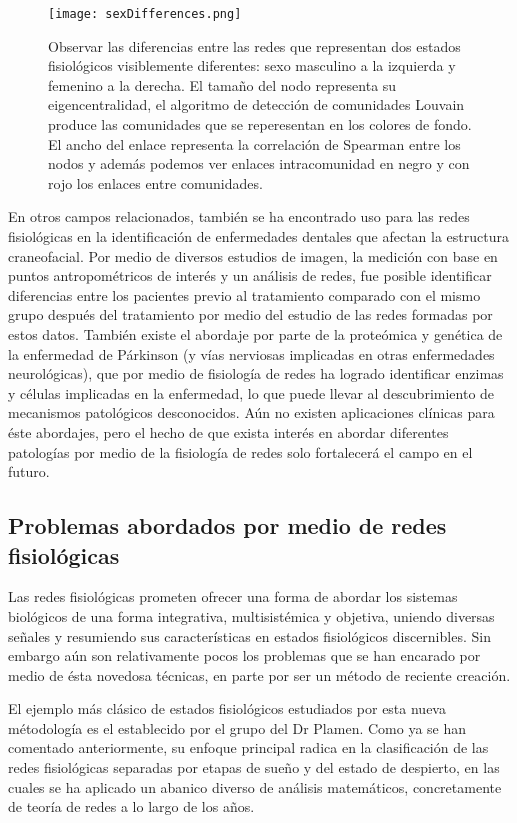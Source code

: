 \documentclass[twoside,twocolumn]{article}
\begin{document}
\begin{figure}
  \texttt{[image: sexDifferences.png]}
  \caption{Observar las diferencias entre las redes que representan dos estados fisiológicos visiblemente diferentes: sexo masculino a la izquierda y femenino a la derecha. El tamaño del nodo representa su eigencentralidad, el algoritmo de detección de comunidades Louvain produce las comunidades que se reperesentan en los colores de fondo. El ancho del enlace representa la correlación de Spearman entre los nodos y además podemos ver enlaces intracomunidad en negro y con rojo los enlaces entre comunidades.}
  \label{fig:sexDifferences}
\end{figure}

En otros campos relacionados, también se ha encontrado uso para las redes fisiológicas en la identificación de enfermedades dentales que afectan la estructura craneofacial\cites{scala2014complex}.
Por medio de diversos estudios de imagen, la medición con base en puntos antropométricos de interés y un análisis de redes, fue posible identificar diferencias entre los pacientes previo al tratamiento comparado con el mismo grupo después del tratamiento por medio del estudio de las redes formadas por estos datos.
También existe el abordaje por parte de la proteómica y genética de la enfermedad de Párkinson (y vías nerviosas implicadas en otras enfermedades neurológicas), que por medio de fisiología de redes ha logrado identificar enzimas y células implicadas en la enfermedad\cite{monti2018network}, lo que puede llevar al descubrimiento de mecanismos patológicos desconocidos.
Aún no existen aplicaciones clínicas para éste abordajes, pero el hecho de que exista interés en abordar diferentes patologías por medio de la fisiología de redes solo fortalecerá el campo en el futuro.

\subsection{Problemas abordados por medio de redes fisiológicas}
Las redes fisiológicas prometen ofrecer una forma de abordar los sistemas biológicos de una forma integrativa, multisistémica y objetiva, uniendo diversas señales y resumiendo sus características en estados fisiológicos discernibles\cite{ivanov2016focus}.
Sin embargo aún son relativamente pocos los problemas que se han encarado por medio de ésta novedosa técnicas, en parte por ser un método de reciente creación.

El ejemplo más clásico de estados fisiológicos estudiados por esta nueva métodología es el establecido por el grupo del Dr Plamen.
Como ya se han comentado anteriormente, su enfoque principal radica en la clasificación de las redes fisiológicas separadas por etapas de sueño y del estado de despierto, en las cuales se ha aplicado un abanico diverso de análisis matemáticos, concretamente de teoría de redes a lo largo de los años\cite{bashan2012network}\cite{lin2020dynamic}.
\end{document}
